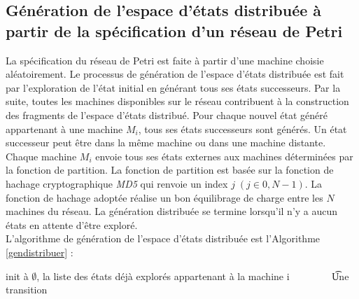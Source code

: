 \subsection{Génération de l’espace d’états distribuée à partir de la spécification d'un réseau de Petri}{
La spécification du réseau de Petri est faite à partir d'une machine choisie aléatoirement. Le processus de génération de l'espace d'états distribuée est fait par l’exploration de l’état initial en générant tous ses états successeurs. Par la suite, toutes les machines disponibles sur le réseau contribuent à la construction des fragments de l’espace d’états distribué. Pour chaque nouvel état généré appartenant à une machine $M_i$, tous ses états successeurs sont générés. Un état successeur peut être dans la même machine ou dans une machine distante. Chaque machine $M_i$ envoie tous ses états externes aux machines déterminées par la fonction de partition. La fonction de partition est basée sur la fonction de hachage cryptographique \emph{MD5} qui renvoie un index $j\;(j \in 0, N-1)$. La fonction de hachage adoptée réalise un bon équilibrage de charge entre les $N$ machines du réseau.  La génération distribuée se termine lorsqu'il n'y a aucun états en attente d'être exploré.\\
L’algorithme de génération de l’espace d’états distribuée est l'Algorithme \ref{gendistribuer} :\\
\begin{algorithm}
	\SetAlgoLined
	\SetAlgoLined	
	\AlgoDontDisplayBlockMarkers\SetAlgoNoEnd\SetAlgoNoLine%
	\si{init à $\emptyset$, la liste des états déjà explorés appartenant à la machine i }
	\t{Une transition}


\end{algorithm}}
